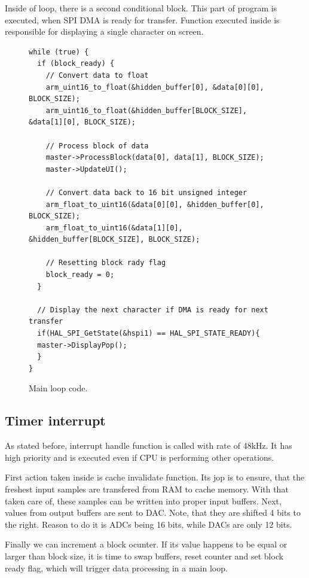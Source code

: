 \documentclass[a4paper,twoside,12pt]{book}
\begin{document}
Inside of loop, there is a second conditional block.
This part of program is executed, when SPI DMA is ready for transfer.
Function executed inside is responsible for displaying a single character on screen.

\begin{figure}[H]
\centering
\begin{lstlisting}
while (true) {
  if (block_ready) {
    // Convert data to float
    arm_uint16_to_float(&hidden_buffer[0], &data[0][0], BLOCK_SIZE);
    arm_uint16_to_float(&hidden_buffer[BLOCK_SIZE], &data[1][0], BLOCK_SIZE);

    // Process block of data
    master->ProcessBlock(data[0], data[1], BLOCK_SIZE);
    master->UpdateUI();

    // Convert data back to 16 bit unsigned integer
    arm_float_to_uint16(&data[0][0], &hidden_buffer[0], BLOCK_SIZE);
    arm_float_to_uint16(&data[1][0], &hidden_buffer[BLOCK_SIZE], BLOCK_SIZE);

    // Resetting block rady flag
    block_ready = 0;
  }

  // Display the next character if DMA is ready for next transfer
  if(HAL_SPI_GetState(&hspi1) == HAL_SPI_STATE_READY){
  master->DisplayPop();
  }
}
\end{lstlisting}
\caption{Main loop code.}
\label{fig:loop}
\end{figure}

\subsection{Timer interrupt}
As stated before, interrupt handle function is called with rate of 48kHz.
It has high priority and
is executed even if CPU is performing other operations.

First action taken inside is cache invalidate function.
Its jop is to ensure, that the freshest input samples
are transfered from RAM to cache memory.
With that taken care of, these samples can be written into
proper input buffers.
Next, values from output buffers are sent to DAC.
Note, that they are shifted 4 bits to the right.
Reason to do it is ADCs being 16 bits, while DACs are only 12 bits.

Finally we can increment a block ocunter.
If its value happens to be equal or larger than block size,
it is time to swap buffers, reset counter and set block ready flag,
which will trigger data processing in a main loop.
\end{document}
